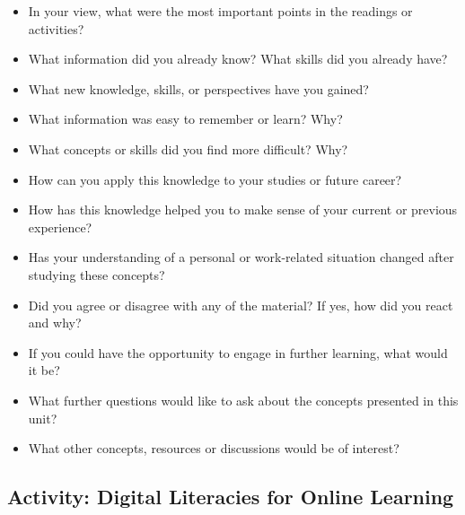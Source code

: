 \documentclass[
  letterpaper,
  DIV=11,
  numbers=noendperiod]{scrreprt}
\providecommand{\tightlist}{%
  \setlength{\itemsep}{0pt}\setlength{\parskip}{0pt}}\usepackage{longtable,booktabs,array}
\begin{document}
\begin{tcolorbox}
\begin{itemize}
\tightlist
\item
  In your view, what were the most important points in the readings or
  activities?
\item
  What information did you already know? What skills did you already
  have?
\item
  What new knowledge, skills, or perspectives have you gained?
\item
  What information was easy to remember or learn? Why?
\item
  What concepts or skills did you find more difficult? Why?
\item
  How can you apply this knowledge to your studies or future career?
\item
  How has this knowledge helped you to make sense of your current or
  previous experience?
\item
  Has your understanding of a personal or work-related situation changed
  after studying these concepts?
\item
  Did you agree or disagree with any of the material? If yes, how did
  you react and why?
\item
  If you could have the opportunity to engage in further learning, what
  would it be?
\item
  What further questions would like to ask about the concepts presented
  in this unit?
\item
  What other concepts, resources or discussions would be of interest?
\end{itemize}

\end{tcolorbox}

\subsection{Activity: Digital Literacies for Online
Learning}\label{activity-digital-literacies-for-online-learning}
\end{document}
